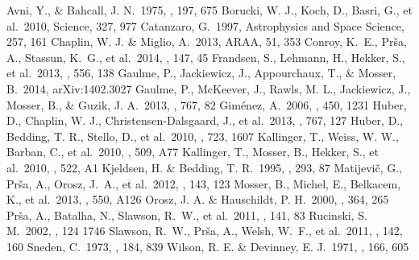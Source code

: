\begin{thebibliography}{}

 Avni, Y., \& Bahcall, J. N.\ 1975, \apj, 197, 675
 Borucki, W. J., Koch, D., Basri, G., et al.\ 2010, Science, 327, 977
 Catanzaro, G.\ 1997, Astrophysics and Space Science, 257, 161
 Chaplin, W. J. \& Miglio, A.\ 2013, ARAA, 51, 353
 Conroy, K.~E., Pr{\v s}a, A., Stassun, K.~G., et al.\ 2014, \aj, 147, 45 
 Frandsen, S., Lehmann, H., Hekker, S., et al.\ 2013, \aap, 556, 138
 Gaulme, P., Jackiewicz, J., Appourchaux, T., \& Mosser, B.\ 2014, arXiv:1402.3027
 Gaulme, P., McKeever, J., Rawls, M. L., Jackiewicz, J., Mosser, B., \& Guzik, J. A.\ 2013, \apj, 767, 82
 Gim{\'e}nez, A.\ 2006, \aap, 450, 1231
 Huber, D., Chaplin, W. J., Christensen-Dalsgaard, J., et al.\ 2013, \apj, 767, 127
 Huber, D., Bedding, T. R., Stello, D., et al.\ 2010, \apj, 723, 1607
 Kallinger, T., Weiss, W. W., Barban, C., et al.\ 2010, \aap, 509, A77
 Kallinger, T., Mosser, B., Hekker, S., et al.\ 2010, \aap, 522, A1
 Kjeldsen, H. \& Bedding, T. R.\ 1995, \aap, 293, 87
 Matijevi{\v c}, G., Pr{\v s}a, A., Orosz, J.~A., et al.\ 2012, \aj, 143, 123 
 Mosser, B., Michel, E., Belkacem, K., et al.\ 2013, \aap, 550, A126
 Orosz, J. A. \& Hauschildt, P. H.\ 2000, \aap, 364, 265
 Pr{\v s}a, A., Batalha, N., Slawson, R.~W., et al.\ 2011, \aj, 141, 83
 Rucinski, S. M.\ 2002, \aj, 124 1746
 Slawson, R.~W., Pr{\v s}a, A., Welsh, W.~F., et al.\ 2011, \aj, 142, 160
 Sneden, C.\ 1973, \apj, 184, 839
 Wilson, R. E. \& Devinney, E. J.\ 1971, \apj, 166, 605

\end{thebibliography}

